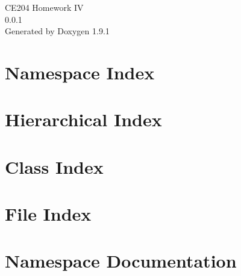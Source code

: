 \let\mypdfximage\pdfximage\def\pdfximage{\immediate\mypdfximage}\documentclass[twoside]{book}
\newcommand{\+}{\discretionary{\mbox{\scriptsize$\hookleftarrow$}}{}{}}
\newcommand{\clearemptydoublepage}{%
  \newpage{\pagestyle{empty}\cleardoublepage}%
}
\begin{document}
\raggedbottom

\hypersetup{pageanchor=false,
             bookmarksnumbered=true,
             pdfencoding=unicode
            }
\begin{titlepage}
\vspace*{7cm}
\begin{center}%
{\Large CE204 Homework IV \\[1ex]\large 0.\+0.\+1 }\\
\vspace*{1cm}
{\large Generated by Doxygen 1.9.1}\\
\end{center}
\end{titlepage}
\clearemptydoublepage
{}
\tableofcontents
\clearemptydoublepage
{}
\hypersetup{pageanchor=true}

\chapter{Namespace Index}

\chapter{Hierarchical Index}

\chapter{Class Index}

\chapter{File Index}

\chapter{Namespace Documentation}


\end{document}
